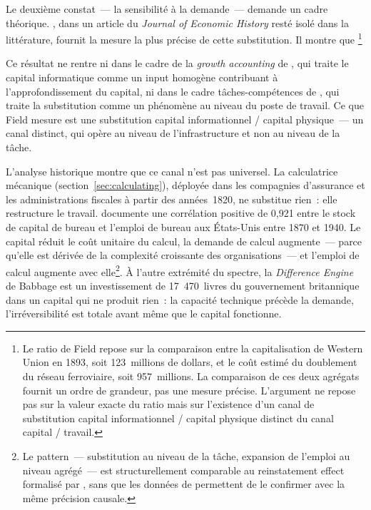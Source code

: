 \markREG
Le deuxième constat~--- la sensibilité à la demande~--- demande un cadre théorique. \textcite{field_magnetic_1992}, dans un article du \emph{Journal of Economic History} resté isolé dans la littérature, fournit la mesure la plus précise de cette substitution. Il montre que \footnote{Le ratio de Field repose sur la comparaison entre la capitalisation de Western Union en 1893, soit 123~millions de dollars, et le coût estimé du doublement du réseau ferroviaire, soit 957~millions. La comparaison de ces deux agrégats fournit un ordre de grandeur, pas une mesure précise. L'argument ne repose pas sur la valeur exacte du ratio mais sur l'existence d'un canal de substitution capital informationnel / capital physique distinct du canal capital / travail.}

Ce résultat ne rentre ni dans le cadre de la \emph{growth accounting} de \textcite{jorgenson_information_2001}, qui traite le capital informatique comme un input homogène contribuant à l'approfondissement du capital, ni dans le cadre tâches-compétences de \textcite{autor_skill_2003}, qui traite la substitution comme un phénomène au niveau du poste de travail. Ce que Field mesure est une substitution capital informationnel / capital physique~--- un canal distinct, qui opère au niveau de l'infrastructure et non au niveau de la tâche.

L'analyse historique montre que ce canal n'est pas universel. La calculatrice mécanique (section~\ref{sec:calculating}), déployée dans les compagnies d'assurance et les administrations fiscales à partir des années~1820, ne substitue rien~: elle restructure le travail. \textcite{reinstaller_historical_2001} documente une corrélation positive de 0,921 entre le stock de capital de bureau et l'emploi de bureau aux États-Unis entre 1870 et 1940. Le capital réduit le coût unitaire du calcul, la demande de calcul augmente~--- parce qu'elle est dérivée de la complexité croissante des organisations~--- et l'emploi de calcul augmente avec elle\footnote{Le pattern~--- substitution au niveau de la tâche, expansion de l'emploi au niveau agrégé~--- est structurellement comparable au reinstatement effect formalisé par \textcite{acemoglu_restrepo_2019}, sans que les données de \textcite{reinstaller_historical_2001} permettent de le confirmer avec la même précision causale.}. À l'autre extrémité du spectre, la \emph{Difference Engine} de Babbage est un investissement de 17~470~livres du gouvernement britannique dans un capital qui ne produit rien~: la capacité technique précède la demande, l'irréversibilité est totale avant même que le capital fonctionne.


